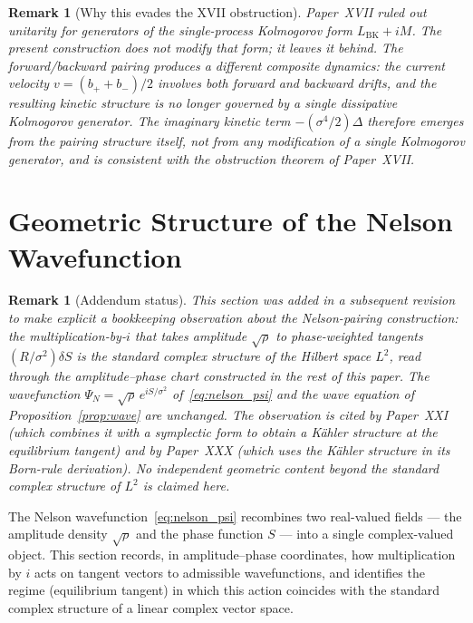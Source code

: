 \documentclass[12pt]{article}
\newtheorem{remark}[theorem]{Remark}
\begin{document}
\begin{remark}[Why this evades the XVII obstruction]\label{rem:obstruction}
Paper~XVII ruled out unitarity for generators of the single-process Kolmogorov form $L_{\mathrm{BK}} + iM$. The present construction does not modify that form; it leaves it behind. The forward/backward pairing produces a different composite dynamics: the current velocity $v = (b_+ + b_-)/2$ involves both forward and backward drifts, and the resulting kinetic structure is no longer governed by a single dissipative Kolmogorov generator. The imaginary kinetic term $-(\sigma^4/2)\Delta$ therefore emerges from the pairing structure itself, not from any modification of a single Kolmogorov generator, and is consistent with the obstruction theorem of Paper~XVII.
\end{remark}

\section{Geometric Structure of the Nelson Wavefunction}\label{sec:geometric}

\begin{remark}[Addendum status]\label{rem:addendum_geometric}
This section was added in a subsequent revision to make explicit a bookkeeping observation about the Nelson-pairing construction: the multiplication-by-$i$ that takes amplitude $\sqrt\rho$ to phase-weighted tangents $(R/\sigma^2)\delta S$ is the standard complex structure of the Hilbert space $L^2$, read through the amplitude--phase chart constructed in the rest of this paper. The wavefunction $\Psi_N = \sqrt{\rho}\,e^{iS/\sigma^2}$ of~\eqref{eq:nelson_psi} and the wave equation of Proposition~\ref{prop:wave} are unchanged. The observation is cited by Paper~XXI (which combines it with a symplectic form to obtain a K\"ahler structure at the equilibrium tangent) and by Paper~XXX (which uses the K\"ahler structure in its Born-rule derivation). No independent geometric content beyond the standard complex structure of $L^2$ is claimed here.
\end{remark}

The Nelson wavefunction~\eqref{eq:nelson_psi} recombines two real-valued fields --- the amplitude density $\sqrt\rho$ and the phase function $S$ --- into a single complex-valued object. This section records, in amplitude--phase coordinates, how multiplication by $i$ acts on tangent vectors to admissible wavefunctions, and identifies the regime (equilibrium tangent) in which this action coincides with the standard complex structure of a linear complex vector space.
\end{document}
